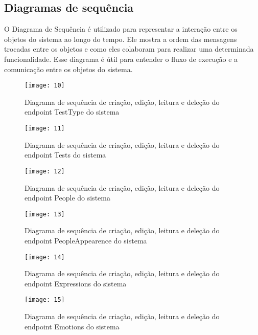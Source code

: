 \clearpage
\subsection{Diagramas de sequência}

O Diagrama de Sequência \cite{28} é utilizado para representar a interação entre os objetos do sistema ao longo do tempo. Ele mostra a ordem das mensagens trocadas entre os objetos e como eles colaboram para realizar uma determinada funcionalidade. Esse diagrama é útil para entender o fluxo de execução e a comunicação entre os objetos do sistema.

\begin{figure}[h]
  \caption{Diagrama de sequência de criação, edição, leitura e deleção do endpoint TestType do sistema}
  \centering
  \texttt{[image: 10]}
\end{figure}
\FloatBarrier

\begin{figure}[h]
  \caption{Diagrama de sequência de criação, edição, leitura e deleção do endpoint Tests do sistema}
  \centering
  \texttt{[image: 11]}
\end{figure}
\FloatBarrier

\begin{figure}[h]
  \caption{Diagrama de sequência de criação, edição, leitura e deleção do endpoint People do sistema}
  \centering
  \texttt{[image: 12]}
\end{figure}
\FloatBarrier

\begin{figure}[h]
  \caption{Diagrama de sequência de criação, edição, leitura e deleção do endpoint PeopleAppearence do sistema}
  \centering
  \texttt{[image: 13]}
\end{figure}
\FloatBarrier

\begin{figure}[h]
  \caption{Diagrama de sequência de criação, edição, leitura e deleção do endpoint Expressions do sistema}
  \centering
  \texttt{[image: 14]}
\end{figure}
\FloatBarrier

\begin{figure}[h]
  \caption{Diagrama de sequência de criação, edição, leitura e deleção do endpoint Emotions do sistema}
  \centering
  \texttt{[image: 15]}
\end{figure}
\FloatBarrier

